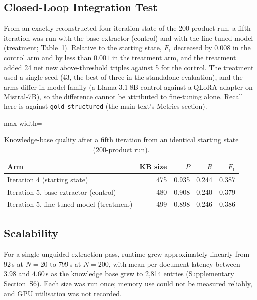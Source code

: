 \documentclass[11pt]{article}
\begin{document}
\subsection{Closed-Loop Integration Test}
\label{sec:results-closedloop}

From an exactly reconstructed four-iteration state of the 200-product
run, a fifth iteration was run with the base extractor (control) and
with the fine-tuned model (treatment; Table~\ref{tab:closedloop}).
Relative to the starting state, $F_1$ decreased by $0.008$ in the control
arm and by less than $0.001$ in the treatment arm, and the treatment
added 24 net new above-threshold triples against 5 for the control. The
treatment used a single seed (43, the best of three in the standalone
evaluation), and the arms differ in model family (a Llama-3.1-8B control
against a QLoRA adapter on Mistral-7B), so the difference cannot be
attributed to fine-tuning alone. Recall here is against
\texttt{gold\_structured} (the main text's Metrics section).

\begin{table}[htbp]
\centering
\caption{Knowledge-base quality after a fifth iteration from an
identical starting state (200-product run).}
\label{tab:closedloop}
\begin{adjustbox}{max width=\textwidth}
\begin{tabular}{@{}lrrrr@{}}
\toprule
Arm & KB size & $P$ & $R$ & $F_1$ \\
\midrule
Iteration 4 (starting state) & 475 & 0.935 & 0.244 & 0.387 \\
Iteration 5, base extractor (control) & 480 & 0.908 & 0.240 & 0.379 \\
Iteration 5, fine-tuned model (treatment) & 499 & 0.898 & 0.246 & 0.386 \\
\bottomrule
\end{tabular}
\end{adjustbox}
\end{table}

\subsection{Scalability}
\label{sec:results-scalability}

For a single unguided extraction pass, runtime grew approximately
linearly from 92\,s at $N=20$ to 799\,s at $N=200$, with mean
per-document latency between $3.98$ and $4.60$\,s as the knowledge base
grew to 2,814 entries (Supplementary Section~S6). Each size was run
once; memory use could not be measured reliably, and GPU utilisation was
not recorded.
\end{document}

